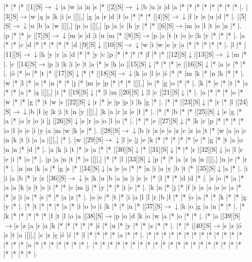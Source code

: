 \documentclass[11pt]{article}
\newcommand\drarr{$\rightarrow \!\!\!\!\! \downarrow$}
\newcommand\rarr{$\rightarrow$}
\newcommand\darr{$\downarrow$}
\begin{document}
\noindent\begin{Puzzle}{23}{28}|*	|*	|*	|[1][S]\drarr	|a	|w	|a	|n	|s	|*	|[2][S]\drarr	|b	|u	|r	|d	|a	|*	|*	|*	|*	|*	|*	|*	|*	|.
|[3][S]\rarr	|w	|ą	|s	|k	|i	|e	|[][,]{ }	|g	|a	|r	|d	|ł	|o	|*	|*	|*	|[4][S]\drarr	|f	|r	|e	|u	|d	|*	|.
|[5][S]\drarr	|u	|b	|a	|w	|[][,]{ }	|p	|o	|[][,]{ }	|p	|a	|c	|h	|y	|*	|*	|[6][S]\rarr	|m	|o	|l	|t	|o	|n	|*	|.
|p	|*	|*	|c	|[7][S]\drarr	|m	|e	|d	|i	|u	|m	|*	|[8][S]\rarr	|p	|a	|t	|r	|o	|c	|h	|y	|*	|*	|*	|.
|a	|*	|*	|c	|d	|*	|*	|*	|*	|*	|d	|[9][S]\darr	|[10][S]\drarr	|w	|i	|w	|e	|r	|a	|*	|*	|*	|*	|*	|.
|l	|*	|[11][S]\drarr	|h	|y	|r	|a	|d	|*	|*	|y	|c	|p	|*	|*	|*	|*	|f	|*	|*	|[12][S]\darr	|[13][S]\drarr	|m	|*	|.
|c	|[14][S]\rarr	|p	|i	|k	|i	|e	|t	|a	|*	|s	|h	|o	|[15][S]\darr	|*	|*	|*	|e	|[16][S]\darr	|*	|a	|c	|*	|*	|.
|ó	|*	|o	|*	|t	|*	|[17][S]\darr	|*	|*	|[18][S]\drarr	|k	|o	|l	|e	|ś	|*	|*	|m	|k	|*	|n	|h	|*	|*	|.
|w	|*	|l	|*	|a	|*	|n	|*	|*	|j	|*	|m	|e	|p	|*	|*	|*	|[][,]{ }	|o	|*	|g	|o	|*	|*	|.
|k	|*	|e	|*	|t	|*	|a	|*	|*	|a	|*	|ą	|[][,]{ }	|i	|*	|[19][S]\darr	|*	|l	|m	|[20][S]\darr	|l	|c	|[21][S]\darr	|*	|.
|a	|*	|*	|*	|o	|*	|w	|*	|*	|g	|*	|t	|w	|s	|[22][S]\darr	|r	|*	|e	|p	|p	|i	|h	|g	|*	|.
|*	|*	|[23][S]\darr	|*	|r	|*	|l	|[24][S]\drarr	|b	|ł	|ę	|k	|i	|t	|n	|y	|[][,]{ }	|k	|a	|r	|z	|e	|ł	|*	|.
|*	|*	|b	|*	|*	|[25][S]\darr	|e	|g	|*	|a	|*	|o	|r	|o	|i	|j	|[26][S]\darr	|s	|r	|o	|o	|l	|o	|*	|.
|*	|*	|e	|[27][S]\darr	|*	|k	|c	|p	|*	|*	|*	|*	|o	|ł	|e	|e	|i	|y	|a	|m	|w	|k	|s	|*	|.
|[28][S]\drarr	|b	|r	|z	|e	|s	|z	|c	|z	|o	|t	|*	|w	|a	|o	|c	|n	|k	|t	|i	|a	|a	|[][,]{ }	|*	|.
|w	|[29][S]\drarr	|l	|e	|j	|e	|k	|*	|*	|*	|*	|*	|e	|*	|g	|*	|t	|a	|o	|n	|n	|*	|d	|*	|.
|a	|k	|i	|t	|*	|r	|a	|*	|*	|[30][S]\darr	|*	|[31][S]\darr	|*	|*	|r	|[32][S]\darr	|o	|l	|r	|e	|i	|*	|o	|*	|.
|p	|a	|n	|t	|*	|o	|[][,]{ }	|*	|*	|l	|[33][S]\darr	|p	|*	|*	|a	|z	|n	|n	|[][,]{ }	|n	|e	|*	|r	|*	|.
|n	|m	|k	|a	|*	|g	|s	|*	|[34][S]\darr	|a	|e	|o	|*	|*	|n	|i	|a	|y	|b	|t	|*	|[35][S]\darr	|a	|*	|.
|i	|i	|a	|b	|*	|r	|z	|[36][S]\drarr	|s	|k	|u	|b	|a	|n	|i	|e	|c	|*	|ł	|*	|*	|d	|d	|*	|.
|s	|o	|*	|a	|*	|a	|a	|k	|z	|t	|s	|i	|*	|*	|c	|m	|j	|*	|y	|*	|*	|i	|c	|*	|.
|k	|n	|*	|j	|*	|f	|r	|a	|a	|o	|e	|a	|*	|*	|z	|i	|a	|*	|s	|*	|*	|a	|z	|*	|.
|o	|e	|*	|t	|*	|i	|a	|l	|l	|r	|b	|ł	|*	|*	|o	|a	|*	|*	|k	|*	|*	|g	|y	|*	|.
|*	|t	|*	|*	|*	|a	|*	|i	|o	|o	|i	|k	|*	|*	|n	|*	|[37][S]\drarr	|k	|o	|g	|a	|n	|*	|*	|.
|*	|k	|*	|*	|*	|*	|*	|f	|t	|l	|o	|a	|[38][S]\rarr	|p	|o	|d	|k	|o	|w	|a	|*	|o	|*	|*	|.
|*	|a	|[39][S]\rarr	|s	|z	|a	|r	|a	|k	|*	|*	|*	|*	|*	|ś	|*	|u	|*	|y	|*	|*	|z	|*	|*	|.
|*	|*	|[40][S]\rarr	|s	|z	|ó	|s	|t	|a	|[][,]{ }	|c	|z	|ę	|ś	|ć	|*	|l	|*	|*	|*	|*	|a	|*	|*	|.
|*	|*	|*	|*	|*	|*	|*	|*	|*	|*	|*	|*	|*	|*	|*	|*	|a	|*	|*	|*	|*	|*	|*	|*	|.
|*	|*	|*	|*	|*	|*	|*	|*	|*	|*	|*	|*	|*	|*	|*	|*	|*	|*	|*	|*	|*	|*	|*	|*	|.\end{Puzzle}
\end{document}
